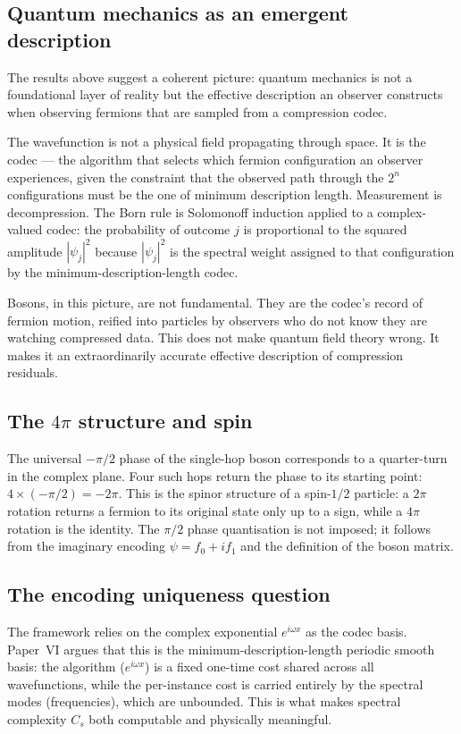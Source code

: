\documentclass[11pt]{article}
\begin{document}
\subsection{Quantum mechanics as an emergent description}

The results above suggest a coherent picture: quantum mechanics is not
a foundational layer of reality but the effective description an observer
constructs when observing fermions that are sampled from a compression codec.

The wavefunction is not a physical field propagating through space.
It is the codec --- the algorithm that selects which fermion configuration an
observer experiences, given the constraint that the observed path through the
$2^n$ configurations must be the one of minimum description length.
Measurement is decompression.
The Born rule is Solomonoff induction applied to a complex-valued codec:
the probability of outcome $j$ is proportional to the squared amplitude
$|\psi_j|^2$ because $|\psi_j|^2$ is the spectral weight assigned to that
configuration by the minimum-description-length codec.

Bosons, in this picture, are not fundamental.
They are the codec's record of fermion motion, reified into particles by
observers who do not know they are watching compressed data.
This does not make quantum field theory wrong.
It makes it an extraordinarily accurate effective description of compression
residuals.

\subsection{The $4\pi$ structure and spin}

The universal $-\pi/2$ phase of the single-hop boson corresponds to a
quarter-turn in the complex plane.
Four such hops return the phase to its starting point: $4 \times (-\pi/2) = -2\pi$.
This is the spinor structure of a spin-$1/2$ particle: a $2\pi$ rotation
returns a fermion to its original state only up to a sign, while a $4\pi$
rotation is the identity.
The $\pi/2$ phase quantisation is not imposed; it follows from the imaginary
encoding $\psi = f_0 + i f_1$ and the definition of the boson matrix.

\subsection{The encoding uniqueness question}

The framework relies on the complex exponential $e^{i\omega x}$ as the codec
basis.
Paper~VI \cite{meskanen2026vi} argues that this is the minimum-description-length
periodic smooth basis: the algorithm ($e^{i\omega x}$) is a fixed one-time cost
shared across all wavefunctions, while the per-instance cost is carried entirely
by the spectral modes (frequencies), which are unbounded.
This is what makes spectral complexity $C_s$ both computable and physically
meaningful.
\end{document}
